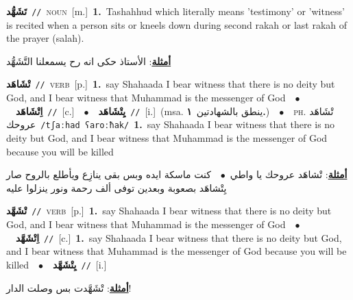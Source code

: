 \documentclass[10pt,a4paper,twoside]{article} %
\begin{document}
\begin{multicols}{2}
{\setlength\topsep{0pt}\textbf{\foreignlanguage{arabic}{تَشَهُّد}}\ {\color{gray}\texttt{//}\color{black}}\ \textsc{noun}\ [m.]\ \textbf{1.}~Tashahhud which literally means 'testimony' or 'witness' is recited when a person sits or kneels down during second rakah or last rakah of the prayer (salah).\  \begin{flushright}\color{gray}\foreignlanguage{arabic}{\textbf{\underline{\foreignlanguage{arabic}{أمثلة}}}: الأستاذ حكى انه رح يسمعلنا التَّشَهُّد}\end{flushright}\color{black}} \vspace{2mm}

{\setlength\topsep{0pt}\textbf{\foreignlanguage{arabic}{تْشَاهَد}}\ {\color{gray}\texttt{//}\color{black}}\ \textsc{verb}\ [p.]\ \textbf{1.}~say Shahaada I bear witness that there is no deity but God, and I bear witness that Muhammad is the messenger of God\ \ $\bullet$\ \ \setlength\topsep{0pt}\textbf{\foreignlanguage{arabic}{اِتْشَاهَد}}\ {\color{gray}\texttt{//}\color{black}}\ [c.]\ \ $\bullet$\ \ \setlength\topsep{0pt}\textbf{\foreignlanguage{arabic}{يِتْشَاهَد}}\ {\color{gray}\texttt{//}\color{black}}\ [i.]\ \color{gray}(msa. \foreignlanguage{arabic}{ينطق بالشهادتين}~\foreignlanguage{arabic}{\textbf{١.}})\color{black}\ \ $\bullet$\ \ \textsc{ph.} \color{gray} \foreignlanguage{arabic}{تْشَاهَد عروحك}\color{black}\ {\color{gray}\texttt{/{\sffamily tʃaːhad ʕaroːħak}/}\color{black}}\ \textbf{1.}~say Shahaada I bear witness that there is no deity but God, and I bear witness that Muhammad is the messenger of God because you will be killed\  \begin{flushright}\color{gray}\foreignlanguage{arabic}{\textbf{\underline{\foreignlanguage{arabic}{أمثلة}}}: تْشاهَد عروحك يا واطي\ $\bullet$\ \  كنت ماسكة ايده وبس بقى ينازِع ويأطلع بالروح صار يِتْشاهَد بصعوبة وبعدين توفى ألف رحمة ونور ينزلوا عليه}\end{flushright}\color{black}} \vspace{2mm}

{\setlength\topsep{0pt}\textbf{\foreignlanguage{arabic}{تْشَهَّد}}\ {\color{gray}\texttt{//}\color{black}}\ \textsc{verb}\ [p.]\ \textbf{1.}~say Shahaada I bear witness that there is no deity but God, and I bear witness that Muhammad is the messenger of God\ \ $\bullet$\ \ \setlength\topsep{0pt}\textbf{\foreignlanguage{arabic}{اِتْشَهَّد}}\ {\color{gray}\texttt{//}\color{black}}\ [c.]\ \textbf{1.}~say Shahaada I bear witness that there is no deity but God, and I bear witness that Muhammad is the messenger of God because you will be killed\ \ $\bullet$\ \ \setlength\topsep{0pt}\textbf{\foreignlanguage{arabic}{يِتْشَهَّد}}\ {\color{gray}\texttt{//}\color{black}}\ [i.]\  \begin{flushright}\color{gray}\foreignlanguage{arabic}{\textbf{\underline{\foreignlanguage{arabic}{أمثلة}}}: تْشَهَّدت بس وصلت الدار!}\end{flushright}\color{black}} \vspace{2mm}


\end{multicols}
\end{document}
